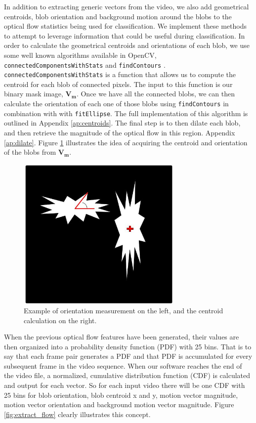 In addition to extracting generic vectors from the video, we also add
geometrical centroids, blob orientation and background motion around the blobs
to the optical flow statistics being used for classification. We implement these
methods to attempt to leverage information that could be useful during
classification. In order to calculate the geometrical centroids and orientations
of each blob, we use some well known algorithms available in OpenCV,
\texttt{connectedComponentsWithStats} and \texttt{findContours}
\cite{itseez2015opencv}. \texttt{connectedComponentsWithStats} is a function
that allows us to compute the centroid for each blob of connected pixels. The
input to this function is our binary mask image, $\mathbf{V_m}$. Once we have
all the connected blobs, we can then calculate the orientation of each one of
those blobs using \texttt{findContours} in combination with with
\texttt{fitEllipse}. The full implementation of this algorithm is outlined in
Appendix \ref{ap:centroids}. The final step is to then dilate each blob, and
then retrieve the magnitude of the optical flow in this region. Appendix
\ref{ap:dilate}. Figure \ref{fig:orient_cent} illustrates the idea of acquiring
the centroid and orientation of the blobs from $\mathbf{V_m}$.

\begin{figure}[h]
  \label{fig:orient_cent}
  \centering
  \includegraphics[width=8cm]{figures/cent_and_orient}
  \caption{Example of orientation measurement on the left, and the centroid
  calculation on the right.}
\end{figure}

When the previous optical flow features have been generated, their values are
then organized into a probability density function (PDF) with 25 bins. That is
to say that each frame pair generates a PDF and that PDF is accumulated for
every subsequent frame in the video sequence. When our software reaches the end
of the video file, a normalized, cumulative distribution function (CDF) is
calculated and output for each vector. So for each input video there will be one
CDF with 25 bins for blob orientation, blob centroid x and y, motion vector
magnitude, motion vector orientation and background motion vector magnitude.
Figure \ref{fig:extract_flow} clearly illustrates this concept.

